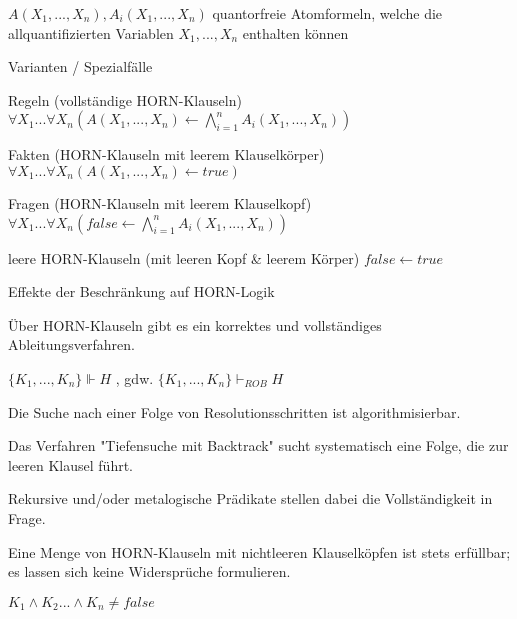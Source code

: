 \documentclass[a4paper]{article}
\begin{document}
\begin{multicols}{3}
  $A(X_1,...,X_n), A_i(X_1,...,X_n)$ quantorfreie Atomformeln, welche die allquantifizierten Variablen $X_1,...,X_n$ enthalten können

  Varianten / Spezialfälle
  \begin{enumerate*}
    \item Regeln (vollständige HORN-Klauseln)        $\forall X_1... \forall X_n(A(X_1,...,X_n)\leftarrow \bigwedge_{i=1}^n A_i(X_1,...,X_n))$
    \item Fakten (HORN-Klauseln mit leerem Klauselkörper)        $\forall X_1...\forall X_n(A(X_1,...,X_n)\leftarrow true)$
    \item Fragen (HORN-Klauseln mit leerem Klauselkopf)        $\forall X_1...\forall X_n(false \leftarrow \bigwedge_{i=1}^n A_i(X_1,...,X_n))$
    \item leere HORN-Klauseln (mit leeren Kopf \& leerem Körper)        $false\leftarrow true$
  \end{enumerate*}

  Effekte der Beschränkung auf HORN-Logik
  \begin{enumerate*}
    \item Über HORN-Klauseln gibt es ein korrektes und vollständiges Ableitungsverfahren.
    \begin{itemize*}
      \item $\{K_1, ...,K_n\} \Vdash H$ , gdw. $\{K_1,...,K_n\} \vdash_{ROB} H$
    \end{itemize*}
    \item Die Suche nach einer Folge von Resolutionsschritten ist algorithmisierbar.
    \begin{itemize*}
      \item Das Verfahren "Tiefensuche mit Backtrack" sucht systematisch eine Folge, die zur leeren Klausel führt.
      \item Rekursive und/oder metalogische Prädikate stellen dabei die Vollständigkeit in Frage.
    \end{itemize*}
    \item Eine Menge von HORN-Klauseln mit nichtleeren Klauselköpfen ist stets erfüllbar; es lassen sich keine Widersprüche formulieren.
    \begin{itemize*}
      \item $K_1 \wedge K_2...\wedge K_n \not= false$
    \end{itemize*}
  \end{enumerate*}


\end{multicols}
\end{document}
